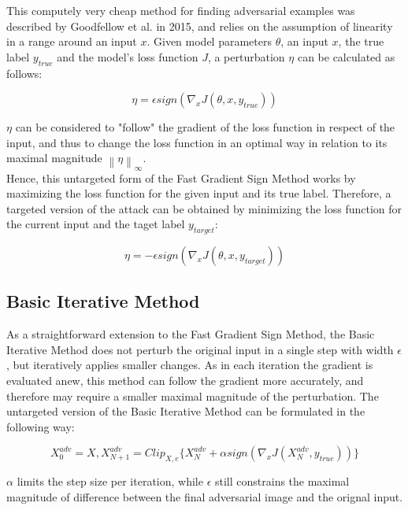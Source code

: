 \documentclass[draft,final]{vutinfth} %
\newcommand{\norm}[1]{\left\lVert#1\right\rVert}
\begin{document}
This computely very cheap method for finding adversarial examples was described by Goodfellow et al. in 2015, and relies on the assumption of linearity in a range around an input $x$.
Given model parameters $\theta$, an input $x$, the true label $y_{true}$ and the model's loss function $J$, a perturbation $\eta$ can be calculated as follows:

\begin{equation}
	\eta = \epsilon sign(\nabla_xJ(\theta, x, y_{true}))
\end{equation}

$\eta$ can be considered to "follow" the gradient of the loss function in respect of the input, and thus to change the loss function in an optimal way in relation to its maximal magnitude $\norm{\eta}_\infty$.
\\
Hence, this untargeted form of the Fast Gradient Sign Method works by maximizing the loss function for the given input and its true label.
Therefore, a targeted version of the attack can be obtained by minimizing the loss function for the current input and the taget label $y_{target}$:

\begin{equation}
	\eta = -\epsilon sign(\nabla_xJ(\theta, x, y_{target}))
\end{equation}
\cite{Goodfellow2015}

\subsection{Basic Iterative Method}

As a straightforward extension to the Fast Gradient Sign Method, the Basic Iterative Method does not perturb the original input in a single step with width $\epsilon$, but iteratively applies smaller changes. As in each iteration the gradient is evaluated anew, this method can follow the gradient more accurately, and therefore may require a smaller maximal magnitude of the perturbation. The untargeted version of the Basic Iterative Method can be formulated in the following way:

\begin{equation}
	X^{adv}_0 = X, X^{adv}_{N+1} = Clip_{X,e}\{X^{adv}_{N} + \alpha sign(\nabla_xJ(X^{adv}_{N}, y_{true})) \}
\end{equation}

$\alpha$ limits the step size per iteration, while $\epsilon$ still constrains the maximal magnitude of difference between the final adversarial image and the orignal input.
\end{document}
